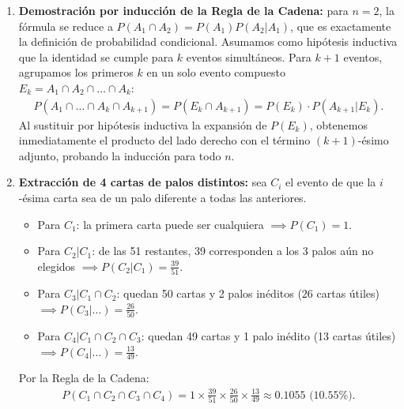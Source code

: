 \begin{solproblema}[prob:8a7282b]
	\begin{enumerate}
		\item \textbf{Demostración por inducción de la Regla de la Cadena:} para $n=2$, la fórmula se reduce a $P(A_1 \cap A_2) = P(A_1)P(A_2|A_1)$, que es exactamente la definición de probabilidad condicional. Asumamos como hipótesis inductiva que la identidad se cumple para $k$ eventos simultáneos. Para $k+1$ eventos, agrupamos los primeros $k$ en un solo evento compuesto $E_k = A_1 \cap A_2 \cap \dots \cap A_k$:
		\begin{align}
			P(A_1 \cap \dots \cap A_k \cap A_{k+1}) = P(E_k \cap A_{k+1}) = P(E_k) \cdot P(A_{k+1}|E_k).
		\end{align}
		Al sustituir por hipótesis inductiva la expansión de $P(E_k)$, obtenemos inmediatamente el producto del lado derecho con el término $(k+1)$-ésimo adjunto, probando la inducción para todo $n$.

		\item \textbf{Extracción de 4 cartas de palos distintos:} sea $C_i$ el evento de que la $i$-ésima carta sea de un palo diferente a todas las anteriores.
		\begin{itemize}
			\item Para $C_1$: la primera carta puede ser cualquiera $\implies P(C_1) = 1$.
			\item Para $C_2|C_1$: de las 51 restantes, 39 corresponden a los 3 palos aún no elegidos $\implies P(C_2|C_1) = \frac{39}{51}$.
			\item Para $C_3|C_1 \cap C_2$: quedan 50 cartas y 2 palos inéditos ($26$ cartas útiles) $\implies P(C_3|\dots) = \frac{26}{50}$.
			\item Para $C_4|C_1 \cap C_2 \cap C_3$: quedan 49 cartas y 1 palo inédito (13 cartas útiles) $\implies P(C_4|\dots) = \frac{13}{49}$.
		\end{itemize}
		Por la Regla de la Cadena:
		\begin{align}
			P(C_1 \cap C_2 \cap C_3 \cap C_4) = 1 \times \frac{39}{51} \times \frac{26}{50} \times \frac{13}{49} \approx 0.1055 \text{ (10.55\%).}
		\end{align}
	\end{enumerate}
\end{solproblema}

